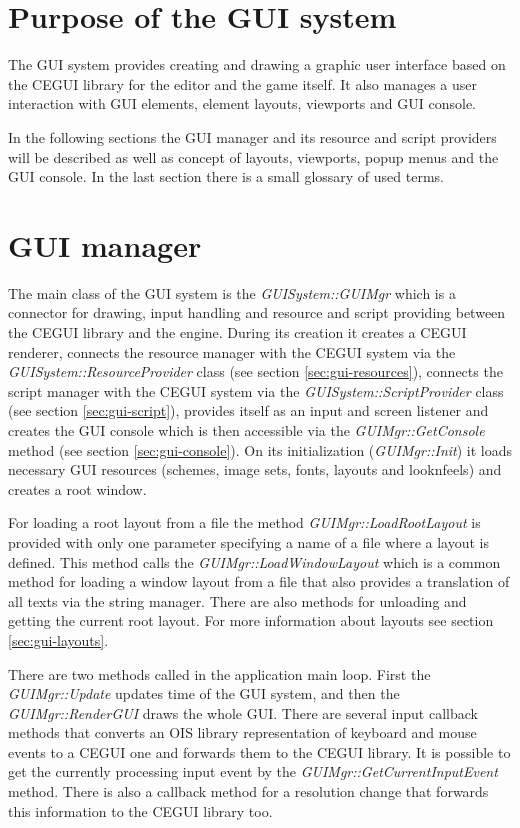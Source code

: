\documentclass[a4paper, 12pt]{report}
\begin{document}
\section{Purpose of the GUI system}

The GUI system provides creating and drawing a graphic user interface based on the CEGUI library for the editor and the game itself. It also manages a user interaction with GUI elements, element layouts, viewports and GUI console.

In the following sections the GUI manager and its resource and script providers will be described as well as concept of layouts, viewports, popup menus and the GUI console. In the last section there is a small glossary of used terms.

\section{GUI manager}

The main class of the GUI system is the \emph{GUISystem::GUIMgr} which is a connector for drawing, input handling and resource and script providing between the CEGUI library and the engine. During its creation it creates a CEGUI renderer, connects the resource manager with the CEGUI system via the \emph{GUISystem::Resource\-Provider} class (see section \ref{sec:gui-resources}), connects the script manager with the CEGUI system via the \emph{GUISystem::ScriptProvider} class (see section \ref{sec:gui-script}), provides itself as an input and screen listener and creates the GUI console which is then accessible via the \emph{GUIMgr::GetConsole} method (see section \ref{sec:gui-console}). On its initialization (\emph{GUIMgr::Init}) it loads necessary GUI resources (schemes, image sets, fonts, layouts and looknfeels) and creates a root window.

For loading a root layout from a file the method \emph{GUIMgr::LoadRootLayout} is provided with only one parameter specifying a name of a file where a layout is defined. This method calls the \emph{GUIMgr::LoadWindowLayout} which is a common method for loading a window layout from a file that also provides a translation of all texts via the string manager. There are also methods for unloading and getting the current root layout. For more information about layouts see section \ref{sec:gui-layouts}.

There are two methods called in the application main loop. First the \emph{GUIMgr::Update} updates time of the GUI system, and then the \emph{GUIMgr::\-Render\-GUI} draws the whole GUI. There are several input callback methods that converts an OIS library representation of keyboard and mouse events to a CEGUI one and forwards them to the CEGUI library. It is possible to get the currently processing input event by the \emph{GUIMgr::GetCurrentInputEvent} method. There is also a callback method for a resolution change that forwards this information to the CEGUI library too.
\end{document}
